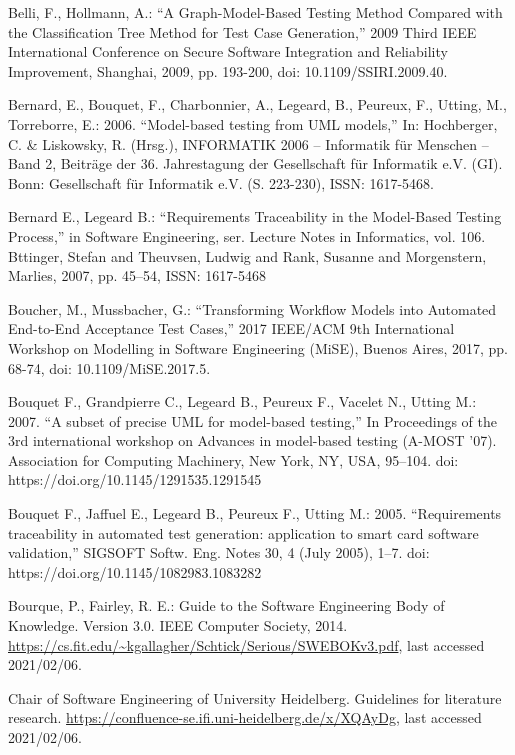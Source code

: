 \documentclass[a4paper,10pt, bibliography=totocnumbered]{scrreprt}
\begin{document}
\begin{thebibliography}{9}
 Belli, F., Hollmann, A.: \enquote{A Graph-Model-Based Testing Method Compared with the Classification Tree Method for Test Case Generation,} 2009 Third IEEE International Conference on Secure Software Integration and Reliability Improvement, Shanghai, 2009, pp. 193-200, doi: 10.1109/SSIRI.2009.40.

 Bernard, E., Bouquet, F., Charbonnier, A., Legeard, B., Peureux, F., Utting, M., Torreborre, E.: 2006. \enquote{Model-based testing from UML models,} In: Hochberger, C. \& Liskowsky, R. (Hrsg.), INFORMATIK 2006 – Informatik für Menschen – Band 2, Beiträge der 36. Jahrestagung der Gesellschaft für Informatik e.V. (GI). Bonn: Gesellschaft für Informatik e.V. (S. 223-230),  ISSN: 1617-5468.

 Bernard E., Legeard B.: \enquote{Requirements Traceability in the Model-Based Testing Process,}  in Software Engineering, ser. Lecture Notes in Informatics, vol. 106. Bttinger, Stefan and Theuvsen, Ludwig and Rank, Susanne and Morgenstern, Marlies, 2007, pp. 45–54, ISSN: 1617-5468

 Boucher, M., Mussbacher, G.: \enquote{Transforming Workflow Models into Automated End-to-End Acceptance Test Cases,} 2017 IEEE/ACM 9th International Workshop on Modelling in Software Engineering (MiSE), Buenos Aires, 2017, pp. 68-74, doi: 10.1109/MiSE.2017.5.

 Bouquet F., Grandpierre C., Legeard B., Peureux F., Vacelet N., Utting M.: 2007. \enquote{A subset of precise UML for model-based testing,} In Proceedings of the 3rd international workshop on Advances in model-based testing (A-MOST '07). Association for Computing Machinery, New York, NY, USA, 95–104. doi: https://doi.org/10.1145/1291535.1291545

 Bouquet F., Jaffuel E., Legeard B., Peureux F., Utting M.: 2005. \enquote{Requirements traceability in automated test generation: application to smart card software validation,} SIGSOFT Softw. Eng. Notes 30, 4 (July 2005), 1–7. doi: https://doi.org/10.1145/1082983.1083282

 Bourque, P., Fairley, R. E.: Guide to the Software Engineering Body of Knowledge. Version 3.0.
IEEE Computer Society, 2014. \url{https://cs.fit.edu/~kgallagher/Schtick/Serious/SWEBOKv3.pdf}, last accessed 2021/02/06.

 Chair of Software Engineering of University Heidelberg. Guidelines for literature research.
\url{https://confluence-se.ifi.uni-heidelberg.de/x/XQAyDg}, last accessed 2021/02/06. 


\end{thebibliography}
\end{document}

